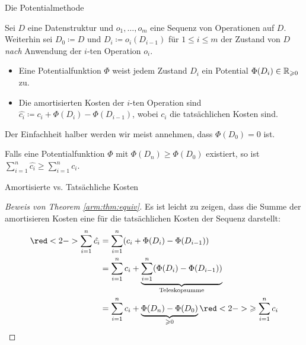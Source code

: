 \begin{frame}{Die Potentialmethode}
\begin{definition}[Potentialmethode]
Sei $D$ eine Datenstruktur und $o_1, \dots, o_m$ eine Sequenz von Operationen auf $D$.
Weiterhin sei $D_0 \coloneqq D$ und $D_i \coloneqq o_i(D_{i-1})$ f\"ur $1 \leq i \leq m$ der \alert{Zustand} von $D$ \emph{nach} Anwendung der $i$-ten Operation $o_i$.

\begin{itemize}
    \item Eine \alert{Potentialfunktion} $\Phi$ weist jedem Zustand $D_i$ ein \alert{Potential} $\Phi(D_i) \in \mathbb{R}_{\geqslant 0}$ zu.
    \item Die \alert{amortisierten Kosten} der $i$-ten Operation sind $\hat{c_i} \coloneqq c_i + \Phi(D_i) - \Phi(D_{i-1})$, wobei $c_i$ die \alert{tats\"achlichen Kosten} sind.
\end{itemize}
\end{definition}

\begin{remark}
Der Einfachheit halber werden wir meist annehmen, dass $\Phi(D_0) = 0$ ist.
\end{remark}

\begin{theorem}\label{arm:thm:equiv}
\vspace*{-6pt}
Falls eine Potentialfunktion $\Phi$ mit $\Phi(D_n) \geq \Phi(D_0)$ existiert, so ist $\sum_{i=1}^n \hat{c_i} \geq \sum_{i=1}^n c_i$.
\end{theorem}
\end{frame}

\begin{frame}{Amortisierte vs. Tats\"achliche Kosten}
\begin{proof}[Beweis von Theorem \ref{arm:thm:equiv}]
Es ist leicht zu zeigen, dass die Summe der amortisieren Kosten eine \alert{ f\"ur die tats\"achlichen Kosten} der Sequenz darstellt:
\begin{align*}
    \red<2->{\sum_{i=1}^n \hat{c_i}} &= \sum_{i=1}^n (c_i + \Phi(D_i) - \Phi(D_{i-1})) \\
    &= \sum_{i=1}^n c_i + \underbrace{\sum_{i=1}^n (\Phi(D_i) - \Phi(D_{i-1}))}_{\text{Teleskopsumme}} \\
    &= \sum_{i=1}^n c_i + \underbrace{\Phi(D_n) - \Phi(D_0)}_{\geq 0} \red<2->{\geq \sum_{i=1}^n c_i}
\end{align*}
\end{proof}
\end{frame}


